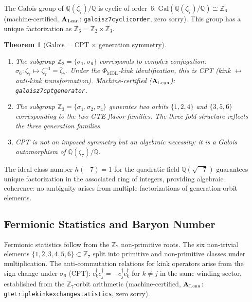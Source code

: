 \documentclass[11pt]{article}
\newtheorem{theorem}{Theorem}[section]
\theoremstyle{remark}
\newcommand{\PHIMDL}{\Phi_{\mathrm{MDL}}}
\newcommand{\ZS}{\mathbb{Z}_7}
\newcommand{\lean}[1]{%
  \penalty-100
  \begingroup\def\_{\textunderscore\allowbreak}\texttt{#1}\endgroup}
\newcommand{\CatAL}{\ensuremath{\textbf{A}_{\rm Lean}}}
\begin{document}
The Galois group of $\mathbb{Q}(\zeta_7)/\mathbb{Q}$ is cyclic of order~6:
$\mathrm{Gal}(\mathbb{Q}(\zeta_7)/\mathbb{Q}) \cong \mathbb{Z}_6$ (machine-certified, $\CatAL$:
\lean{galois\_z7\_cyclic\_order\_6}, zero sorry).  This group has a unique factorization
as $\mathbb{Z}_6 = \mathbb{Z}_2\times\mathbb{Z}_3$.

\begin{theorem}[Galois = CPT $\times$ generation symmetry]
\label{thm:galois}
\leavevmode
\begin{enumerate}[label=(\roman*)]
\item The subgroup $\mathbb{Z}_2 = \{\sigma_1, \sigma_6\}$ corresponds to complex
  conjugation: $\sigma_6:\zeta_7\mapsto\zeta_7^{-1} = \bar\zeta_7$.  Under the
  $\PHIMDL$-kink identification, this is CPT (kink $\leftrightarrow$ anti-kink
  transformation).  Machine-certified ($\CatAL$): \lean{galois\_z7\_cpt\_generator}.
\item The subgroup $\mathbb{Z}_3 = \{\sigma_1, \sigma_2, \sigma_4\}$ generates two
  orbits $\{1,2,4\}$ and $\{3,5,6\}$ corresponding to the two GTE flavor families.
  The three-fold structure reflects the three generation families.
\item CPT is not an imposed symmetry but an algebraic necessity: it is a Galois
  automorphism of $\mathbb{Q}(\zeta_7)/\mathbb{Q}$.
\end{enumerate}
\end{theorem}

The ideal class number $h(-7) = 1$ for the quadratic field $\mathbb{Q}(\sqrt{-7})$
guarantees unique factorization in the associated ring of integers, providing algebraic
coherence: no ambiguity arises from multiple factorizations of generation-orbit elements.

\subsection{Fermionic Statistics and Baryon Number}
\label{sec:fermion_baryon}

Fermionic statistics follow from the $\ZS$ non-primitive roots.  The six non-trivial
elements $\{1,2,3,4,5,6\}\subset\ZS$ split into primitive and non-primitive classes
under multiplication.  The anti-commutation relations for kink operators arise from
the sign change under $\sigma_6$ (CPT): $c^\dagger_k c^\dagger_j = -c^\dagger_j c^\dagger_k$
for $k\neq j$ in the same winding sector, established from the $\ZS$-orbit arithmetic
(machine-certified, $\CatAL$: \lean{gte\_triple\_kink\allowbreak\_exchange\_statistics}, zero sorry).
\end{document}
